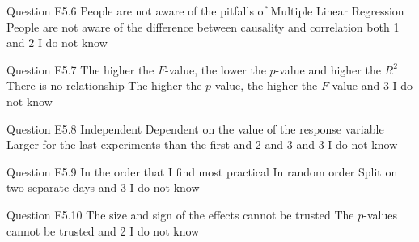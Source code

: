 \begin{frame}{Question E5.6}
	\QuestionNotes{}
	\QuestionAnswers
	{
		\answer People are not aware of the pitfalls of Multiple Linear Regression
		\answer People are not aware of the difference between causality and correlation
		\correctanswer both 1 and 2
		\answer I do not know
	}
\end{frame}


\begin{frame}{Question E5.7}
	\QuestionNotes{}
	\QuestionAnswers
	{
		\answer The higher the $F$-value, the lower the $p$-value and higher the $R^{2}$
		\answer There is no relationship
		\answer The higher the $p$-value, the higher the $F$-value
		 and 3
		\answer I do not know
	}
\end{frame}


\begin{frame}{Question E5.8}
	\QuestionNotes{}
	\QuestionAnswers
	{
		\correctanswer Independent
		\answer Dependent on the value of the response variable
		\answer Larger for the last experiments than the first
		 and 2
		 and 3
		 and 3
		\answer I do not know
	}
\end{frame}


\begin{frame}{Question E5.9}
	\QuestionNotes{}
	\QuestionAnswers
	{
		\correctanswer In the order that I find most practical
		\answer In random order
		\answer Split on two separate days
		 and 3
		\answer I do not know
	}
\end{frame}


\begin{frame}{Question E5.10}
	\QuestionNotes{}
	\QuestionAnswers
	{
		\answer The size and sign of the effects cannot be trusted 
		\answer The $p$-values cannot be trusted
		 and 2
		\answer I do not know
	}
\end{frame}


